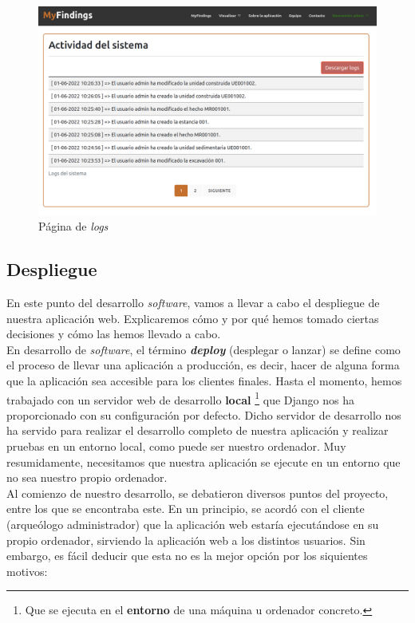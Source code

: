 \begin{enumerate}
            \begin{figure}[H]
                \centering
                \includegraphics[scale=0.20]{imagenes/logs.png}
                \caption{Página de \textit{logs}}
                \label{fig:log-template}
            \end{figure}

    \end{enumerate}

\subsection{Despliegue}
En este punto del desarrollo \textit{software}, vamos a llevar a cabo el despliegue de
nuestra aplicación web. Explicaremos cómo y por qué hemos tomado ciertas decisiones
y cómo las hemos llevado a cabo. \\

En desarrollo de \textit{software}, el término \textbf{\textit{deploy}} (desplegar o lanzar)
\cite{deploy} se define como el proceso de llevar una aplicación a producción, es decir,
hacer de alguna forma que la aplicación sea accesible para los clientes finales. Hasta el
momento, hemos trabajado con un servidor web de desarrollo \textbf{local} \footnote{Que se
ejecuta en el \textbf{entorno} de una máquina u ordenador concreto.} que Django nos ha
proporcionado con su configuración por defecto. Dicho servidor de desarrollo nos ha servido
para realizar el desarrollo completo de nuestra aplicación y realizar pruebas en un entorno
local, como puede ser nuestro ordenador. Muy resumidamente, necesitamos que nuestra
aplicación se ejecute en un entorno que no sea nuestro propio ordenador. \\

Al comienzo de nuestro desarrollo, se debatieron diversos puntos del proyecto, entre los
que se encontraba este. En un principio, se acordó con el cliente (arqueólogo administrador)
que la aplicación web estaría ejecutándose en su propio ordenador, sirviendo la aplicación
web a los distintos usuarios. Sin embargo, es fácil deducir que esta no es la mejor opción por
los siquientes motivos:

